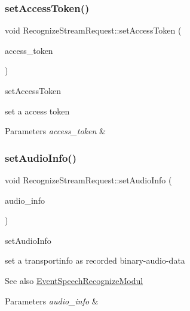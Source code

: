 \subsubsection{\texorpdfstring{set\+Access\+Token()}{setAccessToken()}}
{\footnotesize\ttfamily void Recognize\+Stream\+Request\+::set\+Access\+Token (\begin{DoxyParamCaption}\item[{const char $\ast$}]{access\+\_\+token }\end{DoxyParamCaption})}



set\+Access\+Token 

set a access token 
\begin{DoxyParams}{Parameters}
{\em access\+\_\+token} & \\
\hline
\end{DoxyParams}
\mbox{\label{classAlexaEvent_1_1RecognizeStreamRequest_a82ef05484d92a3bd9f63946125ae549d}} 
\subsubsection{\texorpdfstring{set\+Audio\+Info()}{setAudioInfo()}}
{\footnotesize\ttfamily void Recognize\+Stream\+Request\+::set\+Audio\+Info (\begin{DoxyParamCaption}\item[{\hyperlink{classAlexaEvent_1_1TransportInfo}{Transport\+Info} $\ast$}]{audio\+\_\+info }\end{DoxyParamCaption})}



set\+Audio\+Info 

set a transportinfo as recorded binary-\/audio-\/data \begin{DoxySeeAlso}{See also}
\hyperlink{classAlexaEvent_1_1EventSpeechRecognizeModul}{Event\+Speech\+Recognize\+Modul} 
\end{DoxySeeAlso}

\begin{DoxyParams}{Parameters}
{\em audio\+\_\+info} & \\
\hline
\end{DoxyParams}
\mbox{\label{classAlexaEvent_1_1RecognizeStreamRequest_a0ca0052d546cc3ce21d265029d7a7ba5}} 
